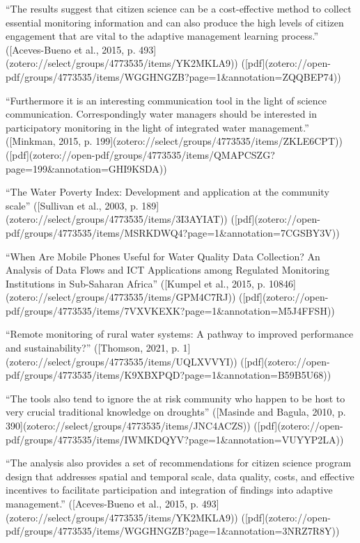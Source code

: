 “The results suggest that citizen science can be a cost-effective method to collect essential monitoring information and can also produce the high levels of citizen engagement that are vital to the adaptive management learning process.” ([Aceves-Bueno et al., 2015, p. 493](zotero://select/groups/4773535/items/YK2MKLA9)) ([pdf](zotero://open-pdf/groups/4773535/items/WGGHNGZB?page=1&annotation=ZQQBEP74))

“Furthermore it is an interesting communication tool in the light of science communication. Correspondingly water managers should be interested in participatory monitoring in the light of integrated water management.” ([Minkman, 2015, p. 199](zotero://select/groups/4773535/items/ZKLE6CPT)) ([pdf](zotero://open-pdf/groups/4773535/items/QMAPCSZG?page=199&annotation=GHI9KSDA))


“The Water Poverty Index: Development and application at the community scale” ([Sullivan et al., 2003, p. 189](zotero://select/groups/4773535/items/3I3AYIAT)) ([pdf](zotero://open-pdf/groups/4773535/items/MSRKDWQ4?page=1&annotation=7CGSBY3V))

“When Are Mobile Phones Useful for Water Quality Data Collection? An Analysis of Data Flows and ICT Applications among Regulated Monitoring Institutions in Sub-Saharan Africa” ([Kumpel et al., 2015, p. 10846](zotero://select/groups/4773535/items/GPM4C7RJ)) ([pdf](zotero://open-pdf/groups/4773535/items/7VXVKEXK?page=1&annotation=M5J4FFSH))

“Remote monitoring of rural water systems: A pathway to improved performance and sustainability?” ([Thomson, 2021, p. 1](zotero://select/groups/4773535/items/UQLXVVYI)) ([pdf](zotero://open-pdf/groups/4773535/items/K9XBXPQD?page=1&annotation=B59B5U68))

“The tools also tend to ignore the at risk community who happen to be host to very crucial traditional knowledge on droughts” ([Masinde and Bagula, 2010, p. 390](zotero://select/groups/4773535/items/JNC4ACZS)) ([pdf](zotero://open-pdf/groups/4773535/items/IWMKDQYV?page=1&annotation=VUYYP2LA))

“The analysis also provides a set of recommendations for citizen science program design that addresses spatial and temporal scale, data quality, costs, and effective incentives to facilitate participation and integration of findings into adaptive management.” ([Aceves-Bueno et al., 2015, p. 493](zotero://select/groups/4773535/items/YK2MKLA9)) ([pdf](zotero://open-pdf/groups/4773535/items/WGGHNGZB?page=1&annotation=3NRZ7R8Y))

